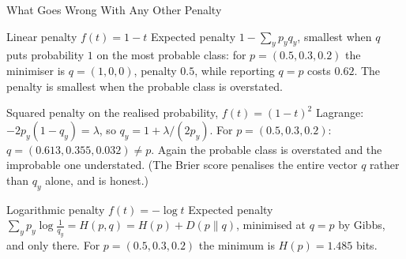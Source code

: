 \begin{frame}{What Goes Wrong With Any Other Penalty}
  \small
  \begin{exampleblock}{Linear penalty $f(t)=1-t$}
    Expected penalty $1-\sum_yp_yq_y$, smallest when $q$ puts probability $1$ on the most probable class: for $p=(0.5,0.3,0.2)$ the minimiser is $q=(1,0,0)$, penalty $0.5$, while reporting $q=p$ costs $0.62$. The penalty is smallest when the probable class is overstated.
  \end{exampleblock}
  \begin{exampleblock}{Squared penalty on the realised probability, $f(t)=(1-t)^2$}
    Lagrange: $-2p_y(1-q_y)=\lambda$, so $q_y=1+\lambda/(2p_y)$. For $p=(0.5,0.3,0.2)$: $q=(0.613,0.355,0.032)\ne p$. Again the probable class is overstated and the improbable one understated. (The Brier score penalises the entire vector $q$ rather than $q_y$ alone, and is honest.)
  \end{exampleblock}
  \begin{exampleblock}{Logarithmic penalty $f(t)=-\log t$}
    Expected penalty $\sum_yp_y\log\frac1{q_y}=H(p,q)=H(p)+D(p\|q)$, minimised at $q=p$ by Gibbs, and only there. For $p=(0.5,0.3,0.2)$ the minimum is $H(p)=1.485$ bits.
  \end{exampleblock}
\end{frame}

